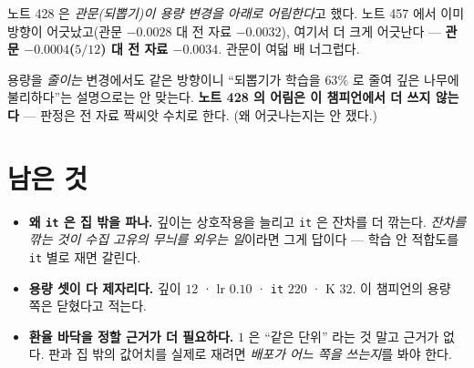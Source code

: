 \documentclass[11pt]{article}
\begin{document}
노트 428 은 \emph{관문(되뽑기)이 용량 변경을 아래로 어림한다}고 했다.
노트 457 에서 이미 방향이 어긋났고(관문 $-0.0028$ 대 전 자료 $-0.0032$),
여기서 더 크게 어긋난다 --- \textbf{관문 $-0.0004$($5/12$) 대 전 자료
$-0.0034$}. 관문이 여덟 배 너그럽다.

용량을 \emph{줄이는} 변경에서도 같은 방향이니 ``되뽑기가 학습을 $63\%$ 로
줄여 깊은 나무에 불리하다''는 설명으로는 안 맞는다. \textbf{노트 428 의
어림은 이 챔피언에서 더 쓰지 않는다} --- 판정은 전 자료 짝씨앗 수치로
한다. (왜 어긋나는지는 안 쟀다.)

\section*{남은 것}

\begin{itemize}
\item \textbf{왜 \texttt{it} 은 집 밖을 파나.} 깊이는 상호작용을 늘리고
\texttt{it} 은 잔차를 더 깎는다. \emph{잔차를 깎는 것이 수집 고유의
무늬를 외우는 일}이라면 그게 답이다 --- 학습 안 적합도를 \texttt{it}
별로 재면 갈린다.
\item \textbf{용량 셋이 다 제자리다.} 깊이 $12$ · lr $0.10$ · \texttt{it}
$220$ · K $32$. 이 챔피언의 용량 쪽은 닫혔다고 적는다.
\item \textbf{환율 바닥을 정할 근거가 더 필요하다.} $1$ 은 ``같은 단위''
라는 것 말고 근거가 없다. 판과 집 밖의 값어치를 실제로 재려면
\emph{배포가 어느 쪽을 쓰는지}를 봐야 한다.
\end{itemize}
\end{document}
